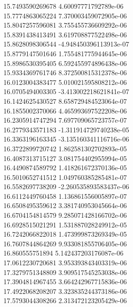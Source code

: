 {15.7493590269678 4.60097771792789e-06 \\
15.7774863065224 7.370003459072905e-06 \\
15.8047257596081 3.755455736609292e-06 \\
15.8391438413491 3.619708877522498e-06 \\
15.8628098306544 -4.948450396113913e-07 \\
15.8779147501646 1.755481775944645e-06 \\
15.8986530395405 6.592455974896438e-06 \\
15.9334369761746 8.372500815312378e-06 \\
16.0123004383477 5.010021595808212e-06 \\
16.0705494003305 -3.413002218621841e-07 \\
16.1424625430527 8.658729484523064e-07 \\
16.1855002370066 4.465993697522208e-06 \\
16.2305914747294 7.697709065723757e-07 \\
16.2779343571183 -1.311914729740238e-05 \\
16.3363196163345 -3.135160341116716e-06 \\
16.3722899720742 1.862581302702893e-05 \\
16.4087313715127 3.081754402955994e-05 \\
16.4490874589792 1.418261672370136e-05 \\
16.5010652741512 1.049760385285481e-07 \\
16.5582697738209 -2.260535893583437e-06 \\
16.6112449760458 1.136861556005897e-07 \\
16.6508495359612 3.381740953045664e-06 \\
16.6704154814579 9.285071428166702e-06 \\
16.6928515021291 1.531887028249912e-05 \\
16.7242066822018 1.473999873269349e-05 \\
16.7607844864269 9.933081855706405e-06 \\
16.860555751894 5.142437203176087e-06 \\
17.0612230720681 3.953393843403319e-06 \\
17.3279751348809 3.909517545253038e-06 \\
17.3904814967455 3.664242967715836e-06 \\
17.4922068208207 3.323835244373186e-06 \\
17.5793044308266 2.313472123205429e-06 \\
}
